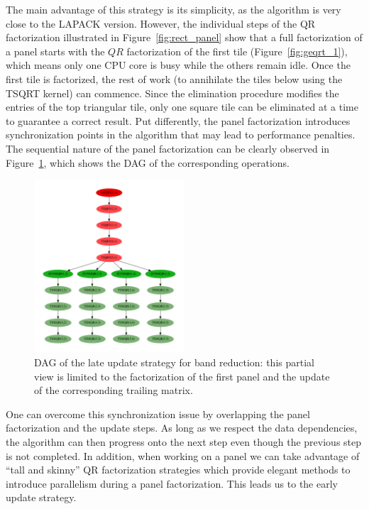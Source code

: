 The main advantage of this strategy is its simplicity, as the algorithm
is very close to the LAPACK version.  However, the individual steps of
the QR factorization illustrated in Figure~\ref{fig:rect_panel} show
that a full factorization of a panel starts with the $QR$
factorization of the first tile (Figure~\ref{fig:geqrt_1}), which
means only one CPU core is busy while the others remain idle.  Once
the first tile is factorized, the rest of work (to annihilate the
tiles below using the TSQRT kernel) can commence.  Since the
elimination procedure modifies the entries of the top triangular tile,
only one square tile can be eliminated at a time to guarantee a
correct result.  Put differently, the panel factorization introduces
synchronization points in the algorithm that may lead to performance
penalties.  The sequential nature of the panel factorization can be
clearly observed in Figure~\ref{fig:dag_panel}, which shows the DAG of
the corresponding operations.

\begin{figure}
  \begin{center}
    \includegraphics[width=0.5\textwidth]{fig/dag}
  \end{center}
  \caption{DAG of the late update strategy for band reduction:
    this partial view is limited to the factorization of the first panel and
    the update of the corresponding trailing matrix.}
  \label{fig:dag_panel}
\end{figure}

One can overcome this synchronization issue by overlapping the panel
factorization and the update steps.  As long as we respect the data
dependencies, the algorithm can then progress onto the next step even
though the previous step is not completed.  In addition, when working
on a panel we can take advantage of ``tall and skinny'' QR
factorization strategies which provide elegant methods to introduce
parallelism during a panel factorization.  This leads us to the early
update strategy.

